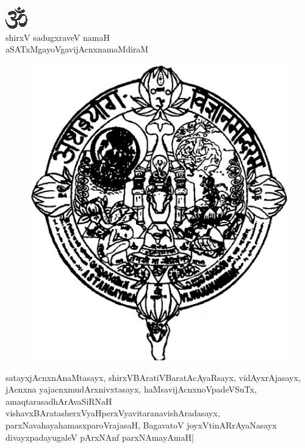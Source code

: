 \newpage

\thispagestyle{empty}

\begin{center}
{\includegraphics[scale=1]{om.eps}}\\[5pt]

{\normalsize shirxV sadugxraveV namaH }\\[5pt]

{\large aSATxMgayoVgavijAcnxnamaMdiraM}
\end{center}

\vskip -20pt

\begin{figure}[h]
\centerline
{\includegraphics[scale=.18]{0000d.eps}}
\end{figure}

satayxjAcnxnAnaMtasayx, shirxVBAratiVBaratAcAyaRsayx, vidAyxrAjasayx, jAcnxna yajacnxmudArxnivxtasayx, haMsavijAcnxnoVpadeVSuTx, amaqtarasadhArAvaSiRNaH vishavxBAratasherxVyaHperxVyavitaranavishAradasayx, parxNavahayahamasxparoVrajasaH, BagavatoV joyxVtinARrAyaNasayx divayxpadayugaleV pArxNAnf parxNAmayAmaH|

